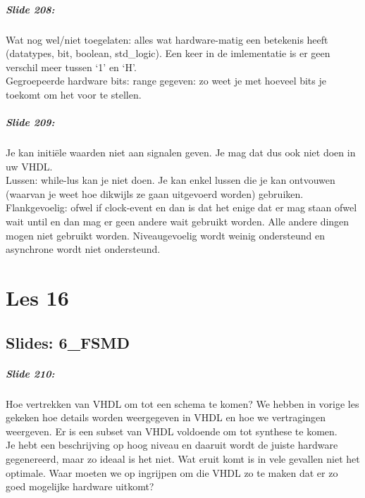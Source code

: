 \documentclass[10pt,a4paper]{book}
\begin{document}
\paragraph{Slide 208:} Wat nog wel/niet toegelaten: alles wat hardware-matig een betekenis heeft (datatypes, bit, boolean, std\_logic). Een keer in de imlementatie is er geen verschil meer tussen `1' en `H'.\\
Gegroepeerde hardware bits: range gegeven: zo weet je met hoeveel bits je toekomt om het voor te stellen. 

\paragraph{Slide 209:} Je kan initi\"ele waarden niet aan signalen geven. Je mag dat dus ook niet doen in uw VHDL.\\
Lussen: while-lus kan je niet doen. Je kan enkel lussen die je kan ontvouwen (waarvan je weet hoe dikwijls ze gaan uitgevoerd worden) gebruiken. Flankgevoelig: ofwel if clock-event en dan is dat het enige dat er mag staan ofwel wait until en dan mag er geen andere wait gebruikt worden. Alle andere dingen mogen niet gebruikt worden. Niveaugevoelig wordt weinig ondersteund en asynchrone wordt niet ondersteund.

\chapter{Les 16}


\section{Slides: 6\_FSMD}

\paragraph{Slide 210:} Hoe vertrekken van VHDL om tot een schema te komen? We hebben in vorige les gekeken hoe details worden weergegeven in VHDL en hoe we vertragingen weergeven. Er is een subset van VHDL voldoende om tot synthese te komen.\\
Je hebt een beschrijving op hoog niveau en daaruit wordt de juiste hardware gegenereerd, maar zo ideaal is het niet. Wat eruit komt is in vele gevallen niet het optimale. Waar moeten we op ingrijpen om die VHDL zo te maken dat er zo goed mogelijke hardware uitkomt?
\end{document}
